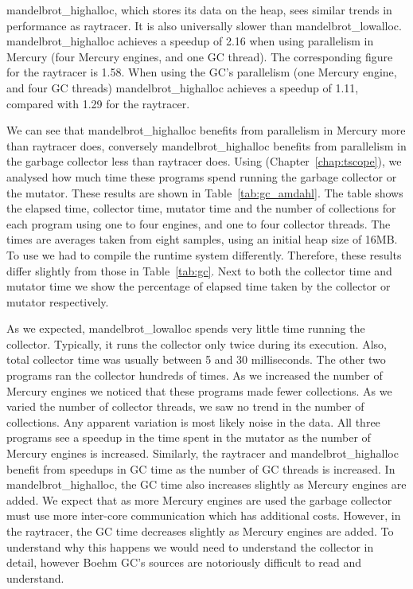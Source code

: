 mandelbrot\_highalloc, which stores its data on the heap,
sees similar trends in performance as raytracer.
It is also universally slower than mandelbrot\_lowalloc.
mandelbrot\_highalloc achieves a speedup of 2.16 when using parallelism in
Mercury (four Mercury engines, and one GC thread).
The corresponding figure for the raytracer is 1.58.
When using the GC's parallelism
(one Mercury engine, and four GC threads)
mandelbrot\_highalloc achieves a speedup of 1.11,
compared with 1.29 for the raytracer.



We can see that mandelbrot\_highalloc benefits from parallelism in Mercury
more than raytracer does,
conversely mandelbrot\_highalloc benefits from parallelism in the garbage
collector less than raytracer does.
Using \tscope (Chapter~\ref{chap:tscope}),
we analysed how much time these programs spend running the garbage collector
or the mutator.
These results are shown in Table~\ref{tab:gc_amdahl}.
The table shows the elapsed time, collector time, mutator time and the
number of collections for each program using one to four engines, and one
to four collector threads.
The times are averages taken from eight samples,
using an initial heap size of 16MB.
To use \tscope we had to compile the runtime system differently.
Therefore,
these results differ slightly from those in Table~\ref{tab:gc}.
Next to both the collector time and mutator time
we show the percentage of elapsed time taken by the collector or mutator
respectively.

As we expected, mandelbrot\_lowalloc spends very little time running the collector.
Typically, it runs the collector only twice during its execution.
Also, total collector time was usually between 5 and 30 milliseconds.
The other two programs ran the collector hundreds of times.
As we increased the number of Mercury engines
we noticed that these programs made fewer collections.
As we varied the number of collector threads,
we saw no trend in the number of collections.
Any apparent variation is most likely noise in the data.
All three programs see a speedup in the time spent in the mutator as the
number of Mercury engines is increased.
Similarly,
the raytracer and mandelbrot\_highalloc benefit from speedups
in GC time as the number of GC threads is increased.
In mandelbrot\_highalloc,
the GC time also increases slightly as Mercury engines are added.
We expect that as more Mercury engines are used the garbage collector
must use more inter-core communication which has additional costs.
However, in the raytracer,
the GC time decreases slightly as Mercury engines are added.
To understand why this happens we would need to understand the collector in
detail,
however Boehm GC's sources are notoriously difficult to read and
understand.

